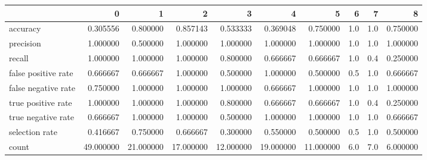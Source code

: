 \begin{tabular}{lrrrrrrrrr}
\toprule
{} &          0 &          1 &          2 &          3 &          4 &          5 &    6 &    7 &         8 \\
\midrule
accuracy            &   0.305556 &   0.800000 &   0.857143 &   0.533333 &   0.369048 &   0.750000 &  1.0 &  1.0 &  0.750000 \\
precision           &   1.000000 &   0.500000 &   1.000000 &   1.000000 &   1.000000 &   1.000000 &  1.0 &  1.0 &  1.000000 \\
recall              &   1.000000 &   1.000000 &   1.000000 &   0.800000 &   0.666667 &   0.666667 &  1.0 &  0.4 &  0.250000 \\
false positive rate &   0.666667 &   0.666667 &   1.000000 &   0.500000 &   1.000000 &   0.500000 &  0.5 &  1.0 &  0.666667 \\
false negative rate &   0.750000 &   1.000000 &   1.000000 &   1.000000 &   0.666667 &   1.000000 &  1.0 &  1.0 &  1.000000 \\
true positive rate  &   1.000000 &   1.000000 &   1.000000 &   0.800000 &   0.666667 &   0.666667 &  1.0 &  0.4 &  0.250000 \\
true negative rate  &   0.666667 &   1.000000 &   1.000000 &   0.500000 &   1.000000 &   1.000000 &  1.0 &  1.0 &  0.666667 \\
selection rate      &   0.416667 &   0.750000 &   0.666667 &   0.300000 &   0.550000 &   0.500000 &  0.5 &  1.0 &  0.500000 \\
count               &  49.000000 &  21.000000 &  17.000000 &  12.000000 &  19.000000 &  11.000000 &  6.0 &  7.0 &  6.000000 \\
\bottomrule
\end{tabular}
